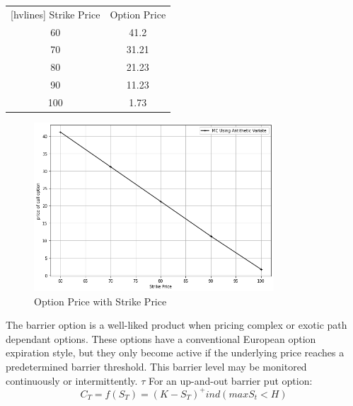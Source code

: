 
\begin{center}
	\begin{NiceTabular}{|c|c|}[hvlines]
		 Strike Price & Option Price\\ 
		60 & 41.2 \\ 
		70 & 31.21 \\
		80 & 21.23 \\
		90 & 11.23  \\
		100 & 1.73 \\
	\end{NiceTabular}
\end{center}

\begin{figure}[H]
	\begin{center}
		\includegraphics[width=0.8\textwidth]{mc_antithetic}
	\end{center}
	\caption{Option Price with Strike Price}
\end{figure}

\noindent The barrier option is a well-liked product when pricing complex or exotic path dependant options. These options have a conventional European option expiration style, but they only become active if the underlying price reaches a predetermined barrier threshold. This barrier level may be monitored continuously or intermittently. $\tau$
For an up-and-out barrier put option:
$$C_{T}=f(S_{T})=(K-S_{T})^+ind( max S_{t}<H)$$

